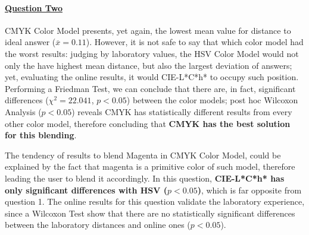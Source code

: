 \paragraph{\ul{Question Two}}
%
CMYK Color Model presents, yet again, the lowest mean value for distance to ideal answer ($\overline{x} = 0.11$).
However, it is not safe to say that which color model had the worst results: judging by laboratory values, the HSV Color Model would not only
the have highest mean distance, but also the largest deviation of answers; yet, evaluating the online results, it would CIE-L*C*h* to occupy
such position. Performing a Friedman Test, we can conclude that there are, in fact, significant differences ($\chi^2 = 22.041$, $p < 0.05$) between
the color models; post hoc Wilcoxon Analysis ($p < 0.05$) reveals CMYK has statistically different results from every other color model, therefore
concluding that \textbf{CMYK has the best solution for this blending}.\par
%
The tendency of results to blend Magenta in CMYK Color Model, could be explained by the fact that magenta is a primitive color of such model,
therefore leading the user to blend it accordingly. In this question, \textbf{CIE-L*C*h* has only significant differences with HSV ($p < 0.05$)},
which is far opposite from question 1. The online results for this question validate the laboratory experience, since a Wilcoxon Test show that there
are no statistically significant differences between the laboratory distances and online ones ($p < 0.05$).
%
